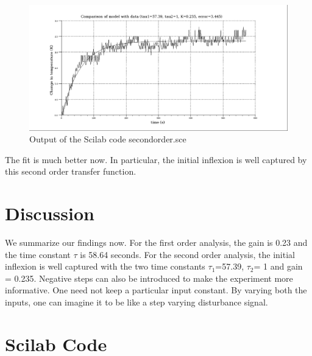 \begin{figure}
\centering
\includegraphics[width=\linewidth]{Step-test_manual/local-2-order.png}
\caption{Output of the Scilab code \ttfamily secondorder.sce}
\label{sorder}
\end{figure}

The fit is much better now.  In particular, the initial inflexion is well captured by this second
order transfer function.


\section{Discussion}
We summarize our findings now. For the first order analysis, the gain is 0.23 and the 
time constant $\tau$ is 58.64 seconds. For the second order analysis, the initial inflexion is 
well captured with the two time constants $\tau_1$=57.39, $\tau_2$= 1 and gain = 0.235. Negative steps 
can also be introduced to make the experiment more informative. One need not keep a particular 
input constant. By varying both the inputs, one can imagine it to be like a step varying disturbance signal.
 



\section{Scilab Code}\label{stepcodes}
\begin{code}

\end{code}

\begin{code}

\end{code}


\begin{code}

\end{code}

